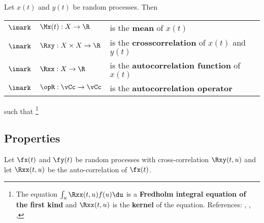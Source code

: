 \begin{definition}
\label{def:Rxx}
\label{def:opR}
\label{def:Rxy}
Let $x(t)$ and $y(t)$ be random processes.
Then

\begin{tabular}{cll}
   $\imark$ & $\Mx(t):X\to\R$       & is the \textbf{mean} of $x(t)$                          \\
   $\imark$ & $\Rxy:X\times X\to\R$ & is the \textbf{crosscorrelation} of $x(t)$ and $y(t)$   \\
   $\imark$ & $\Rxx:X\to\R$         & is the \textbf{autocorrelation function} of $x(t)$      \\
   $\imark$ & $\opR:\vCc\to\vCc$    & is the \textbf{autocorrelation operator}
\end{tabular}

such that
\footnote{
   The equation $\int_u \Rxx(t,u) f(u) \du$ is a
   \textbf{Fredholm integral equation of the first kind} and
   $\Rxx(t,u)$ is the \textbf{kernel} of the equation.
   References: 
     ,
     ,
     ,
   }
\end{definition}



\subsection{Properties}

\begin{theorem}
\label{thm:Rxx_prop}
Let $\fx(t)$ and $\fy(t)$ be random processes with
cross-correlation $\Rxy(t,u)$ and
let $\Rxx(t,u)$ be the auto-correlation of $\fx(t)$.
\end{theorem}

